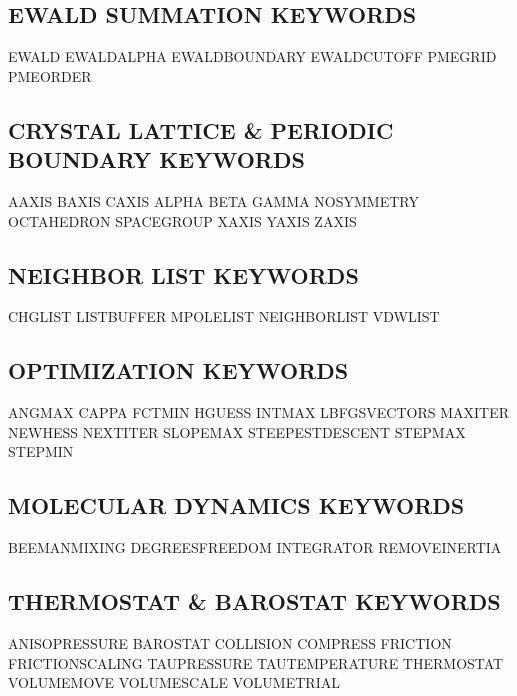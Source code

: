 \documentclass[letterpaper,11pt,english]{sphinxmanual}
\begin{document}
\subsection{EWALD SUMMATION KEYWORDS}
\label{\detokenize{text/keywords:ewald-summation-keywords}}
EWALD   EWALD\sphinxhyphen{}ALPHA     EWALD\sphinxhyphen{}BOUNDARY
EWALD\sphinxhyphen{}CUTOFF    PME\sphinxhyphen{}GRID        PME\sphinxhyphen{}ORDER


\subsection{CRYSTAL LATTICE \& PERIODIC BOUNDARY KEYWORDS}
\label{\detokenize{text/keywords:crystal-lattice-periodic-boundary-keywords}}
A\sphinxhyphen{}AXIS  B\sphinxhyphen{}AXIS  C\sphinxhyphen{}AXIS
ALPHA   BETA    GAMMA
NO\sphinxhyphen{}SYMMETRY     OCTAHEDRON      SPACEGROUP
X\sphinxhyphen{}AXIS  Y\sphinxhyphen{}AXIS  Z\sphinxhyphen{}AXIS


\subsection{NEIGHBOR LIST KEYWORDS}
\label{\detokenize{text/keywords:neighbor-list-keywords}}
CHG\sphinxhyphen{}LIST        LIST\sphinxhyphen{}BUFFER     MPOLE\sphinxhyphen{}LIST
NEIGHBOR\sphinxhyphen{}LIST   VDW\sphinxhyphen{}LIST


\subsection{OPTIMIZATION KEYWORDS}
\label{\detokenize{text/keywords:optimization-keywords}}
ANGMAX  CAPPA   FCTMIN
HGUESS  INTMAX  LBFGS\sphinxhyphen{}VECTORS
MAXITER NEWHESS NEXTITER
SLOPEMAX        STEEPEST\sphinxhyphen{}DESCENT        STEPMAX
STEPMIN


\subsection{MOLECULAR DYNAMICS KEYWORDS}
\label{\detokenize{text/keywords:molecular-dynamics-keywords}}
BEEMAN\sphinxhyphen{}MIXING   DEGREES\sphinxhyphen{}FREEDOM INTEGRATOR
REMOVE\sphinxhyphen{}INERTIA


\subsection{THERMOSTAT \& BAROSTAT KEYWORDS}
\label{\detokenize{text/keywords:thermostat-barostat-keywords}}
ANISO\sphinxhyphen{}PRESSURE  BAROSTAT        COLLISION
COMPRESS        FRICTION        FRICTION\sphinxhyphen{}SCALING
TAU\sphinxhyphen{}PRESSURE    TAU\sphinxhyphen{}TEMPERATURE THERMOSTAT
VOLUME\sphinxhyphen{}MOVE     VOLUME\sphinxhyphen{}SCALE    VOLUME\sphinxhyphen{}TRIAL
\end{document}
